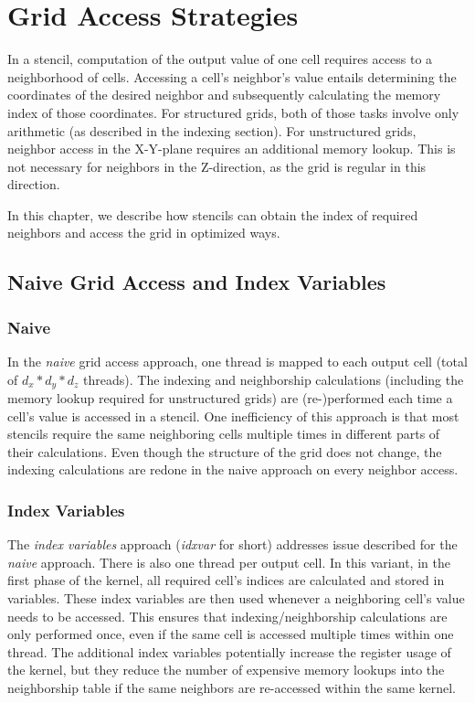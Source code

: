 \chapter{Grid Access Strategies} \label{sec:optimizations}

In a stencil, computation of the output value of one cell requires access to a neighborhood of cells. Accessing a cell's neighbor's value entails determining the coordinates of the desired neighbor and subsequently calculating the memory index of those coordinates. For structured grids, both of those tasks involve only arithmetic (as described in the indexing section). For unstructured grids, neighbor access in the X-Y-plane requires an additional memory lookup. This is not necessary for neighbors in the Z-direction, as the grid is regular in this direction.

In this chapter, we describe how stencils can obtain the index of required neighbors and access the grid in optimized ways.

\section{Naive Grid Access and Index Variables}

\subsection{Naive} In the \emph{naive} grid access approach, one thread is mapped to each output cell (total of $d_x*d_y*d_z$ threads). The indexing and neighborship calculations (including the memory lookup required for unstructured grids) are (re-)performed each time a cell's value is accessed in a stencil.  One inefficiency of this approach is that most stencils require the same neighboring cells multiple times in different parts of their calculations. Even though the structure of the grid does not change, the indexing calculations are redone in the naive approach on every neighbor access.

\subsection{Index Variables} The \emph{index variables} approach (\emph{idxvar} for short) addresses issue described for the \emph{naive} approach. There is also one thread per output cell. In this variant, in the first phase of the kernel, all required cell's indices are calculated and stored in variables. These index variables are then used whenever a neighboring cell's value needs to be accessed. This ensures that indexing/neighborship calculations are only performed once, even if the same cell is accessed multiple times within one thread. The additional index variables potentially increase the register usage of the kernel, but they reduce the number of expensive memory lookups into the neighborship table if the same neighbors are re-accessed within the same kernel.

